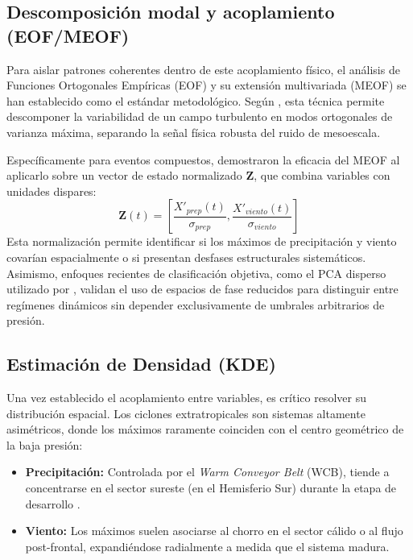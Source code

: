 \subsection{Descomposición modal y acoplamiento (EOF/MEOF)}\label{subsec:mt_math_meof}
Para aislar patrones coherentes dentro de este acoplamiento físico, el análisis de Funciones Ortogonales Empíricas (EOF) y su extensión multivariada (MEOF) se han establecido como el estándar metodológico. Según \citet{hannachi2007empirical}, esta técnica permite descomponer la variabilidad de un campo turbulento en modos ortogonales de varianza máxima, separando la señal física robusta del ruido de mesoescala.

Específicamente para eventos compuestos, \citet{liang2018multivariate} demostraron la eficacia del MEOF al aplicarlo sobre un vector de estado normalizado $\mathbf{Z}$, que combina variables con unidades dispares:
\begin{equation}
    \mathbf{Z}(t) = \left[ \frac{X'_{prep}(t)}{\sigma_{prep}}, \frac{X'_{viento}(t)}{\sigma_{viento}} \right]
\end{equation}
Esta normalización permite identificar si los máximos de precipitación y viento covarían espacialmente o si presentan desfases estructurales sistemáticos. Asimismo, enfoques recientes de clasificación objetiva, como el PCA disperso utilizado por \citet{corner2025classification}, validan el uso de espacios de fase reducidos para distinguir entre regímenes dinámicos sin depender exclusivamente de umbrales arbitrarios de presión.

\subsection{Estimación de Densidad (KDE)}\label{subsec:mt_kde_asimetria}
Una vez establecido el acoplamiento entre variables, es crítico resolver su distribución espacial. Los ciclones extratropicales son sistemas altamente asimétricos, donde los máximos raramente coinciden con el centro geométrico de la baja presión:
\begin{itemize}
    \item \textbf{Precipitación:} Controlada por el \textit{Warm Conveyor Belt} (WCB), tiende a concentrarse en el sector sureste (en el Hemisferio Sur) durante la etapa de desarrollo \citep{blanchard2021warm}.
    \item \textbf{Viento:} Los máximos suelen asociarse al chorro en el sector cálido o al flujo post-frontal, expandiéndose radialmente a medida que el sistema madura.
\end{itemize}

